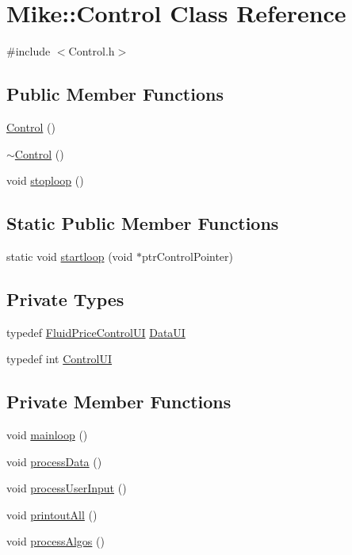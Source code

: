 \hypertarget{class_mike_1_1_control}{}\section{Mike\+:\+:Control Class Reference}
\label{class_mike_1_1_control}


{\ttfamily \#include $<$Control.\+h$>$}

\subsection*{Public Member Functions}
\begin{DoxyCompactItemize}
\item 
\hyperlink{class_mike_1_1_control_ac9a2e3b56773b1eadab7297327a9fbcc}{Control} ()
\item 
\hyperlink{class_mike_1_1_control_aa3395e0509ab5b980732ab0e3a29ce4d}{$\sim$\+Control} ()
\item 
void \hyperlink{class_mike_1_1_control_aa26389eedd6e1c60fa64fe7883ce6ce8}{stoploop} ()
\end{DoxyCompactItemize}
\subsection*{Static Public Member Functions}
\begin{DoxyCompactItemize}
\item 
static void \hyperlink{class_mike_1_1_control_ae34c60ef30c2de2332df13b644c7791f}{startloop} (void $\ast$ptr\+Control\+Pointer)
\end{DoxyCompactItemize}
\subsection*{Private Types}
\begin{DoxyCompactItemize}
\item 
typedef \hyperlink{class_fluid_price_control_u_i}{Fluid\+Price\+Control\+UI} \hyperlink{class_mike_1_1_control_addbe39ef40982f0a4002b6f74091a799}{Data\+UI}
\item 
typedef int \hyperlink{class_mike_1_1_control_a313ca882c409ba9bed4837acf6d17a72}{Control\+UI}
\end{DoxyCompactItemize}
\subsection*{Private Member Functions}
\begin{DoxyCompactItemize}
\item 
void \hyperlink{class_mike_1_1_control_a3440083f03f7da3d4490fa44bc13d62b}{mainloop} ()
\item 
void \hyperlink{class_mike_1_1_control_a887652b2503a6e881fcceca36f0a0af9}{process\+Data} ()
\item 
void \hyperlink{class_mike_1_1_control_ad06eaf996f971a758eea1fd55eda2565}{process\+User\+Input} ()
\item 
void \hyperlink{class_mike_1_1_control_a2f239c6bace6fba6d31d54919b7ee6e1}{printout\+All} ()
\item 
void \hyperlink{class_mike_1_1_control_acf3d41cb5dd54a2ee31cfb0709a79e7e}{process\+Algos} ()
\end{DoxyCompactItemize}
